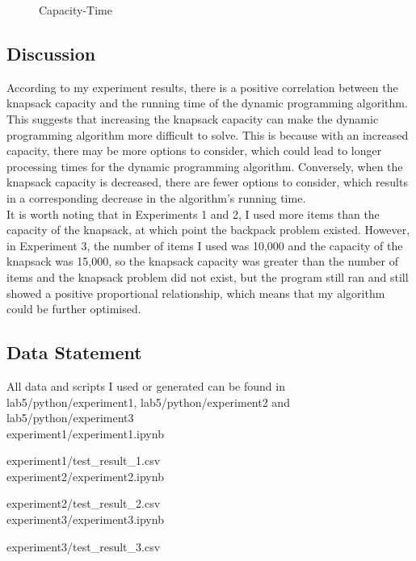 \documentclass[a4]{article}
\begin{document}
\begin{figure}[H]
\begin{minipage}{0.32\textwidth}
    \caption{Capacity-Time}
    \end{minipage}
\end{figure}

\newpage
\subsection{Discussion}

According to my experiment results, there is a positive correlation between the knapsack capacity and the running time of the dynamic programming algorithm. This suggests that increasing the knapsack capacity can make the dynamic programming algorithm more difficult to solve. This is because with an increased capacity, there may be more options to consider, which could lead to longer processing times for the dynamic programming algorithm. Conversely, when the knapsack capacity is decreased, there are fewer options to consider, which results in a corresponding decrease in the algorithm's running time. \\

It is worth noting that in Experiments 1 and 2, I used more items than the capacity of the knapsack, at which point the backpack problem existed. However, in Experiment 3, the number of items I used was 10,000 and the capacity of the knapsack was 15,000, so the knapsack capacity was greater than the number of items and the knapsack problem did not exist, but the program still ran and still showed a positive proportional relationship, which means that my algorithm could be further optimised.

\subsection{Data Statement}

\noindent All data and scripts I used or generated can be found in lab5/python/experiment1, lab5/python/experiment2 and lab5/python/experiment3 \\

\noindent experiment1/experiment1.ipynb

\noindent experiment1/test\_result\_1.csv\\

\noindent experiment2/experiment2.ipynb

\noindent experiment2/test\_result\_2.csv\\

\noindent experiment3/experiment3.ipynb

\noindent experiment3/test\_result\_3.csv

\appendix

\end{document}
